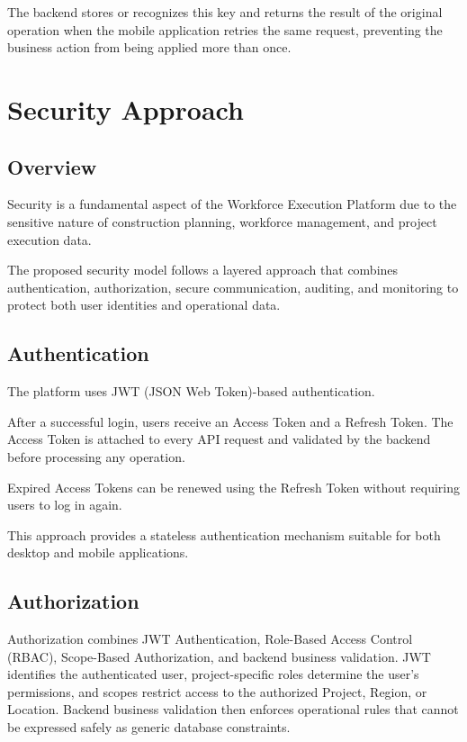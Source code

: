 \documentclass[11pt]{article}
\begin{document}
The backend stores or recognizes this key and returns the result of the original
operation when the mobile application retries the same request, preventing the
business action from being applied more than once.

\clearpage
\setcounter{section}{11}
\section{Security Approach}

\subsection{Overview}

Security is a fundamental aspect of the Workforce Execution Platform due to the
sensitive nature of construction planning, workforce management, and project
execution data.

The proposed security model follows a layered approach that combines
authentication, authorization, secure communication, auditing, and monitoring
to protect both user identities and operational data.

\subsection{Authentication}

The platform uses JWT (JSON Web Token)-based authentication.

After a successful login, users receive an Access Token and a Refresh Token.
The Access Token is attached to every API request and validated by the backend
before processing any operation.

Expired Access Tokens can be renewed using the Refresh Token without requiring
users to log in again.

This approach provides a stateless authentication mechanism suitable for both
desktop and mobile applications.

\subsection{Authorization}

Authorization combines JWT Authentication, Role-Based Access Control (RBAC),
Scope-Based Authorization, and backend business validation. JWT identifies the
authenticated user, project-specific roles determine the user's permissions,
and scopes restrict access to the authorized Project, Region, or Location.
Backend business validation then enforces operational rules that cannot be
expressed safely as generic database constraints.
\end{document}
